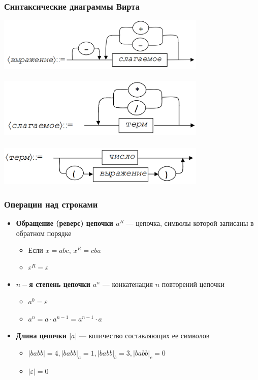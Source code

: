 \documentclass{beamer}
\begin{document}
\begin{frame}[fragile]
  \transwipe[direction=90]
  \frametitle{Синтаксические диаграммы Вирта}
\begin{center}
  \includegraphics[width=0.75\textwidth]{pics/sdexpr.png}  \\~\\     \pause
  \includegraphics[width=0.75\textwidth]{pics/sdfact.png}  \\~\\  \pause   
  \includegraphics[width=0.75\textwidth]{pics/sdterm.png}  
\end{center}
\end{frame}

\begin{frame}[fragile]
  \transwipe[direction=90]
  \frametitle{Операции над строками}
  \begin{itemize}
    \item \textbf{Обращение (реверс) цепочки $a^R$} --- цепочка, символы которой записаны в обратном порядке
    \begin{itemize}
      \item Если $x = abc$, $x^R = cba$
      \item $\varepsilon^R = \varepsilon$
    \end{itemize}
    \item \textbf{$n-$я степень цепочки $a^n$} --- конкатенация $n$ повторений цепочки
    \begin{itemize}
      \item $a^0 = \varepsilon$
      \item $a^n = a \cdot a^{n-1} = a^{n-1} \cdot a$
    \end{itemize}
    \item \textbf{Длина цепочки $|a|$} --- количество составляющих ее символов
    \begin{itemize}
      \item $|babb| = 4, |babb|_a = 1, |babb|_b = 3, |babb|_c = 0$
      \item $|\varepsilon| = 0$
    \end{itemize}
  \end{itemize}
\end{frame}
\end{document}
